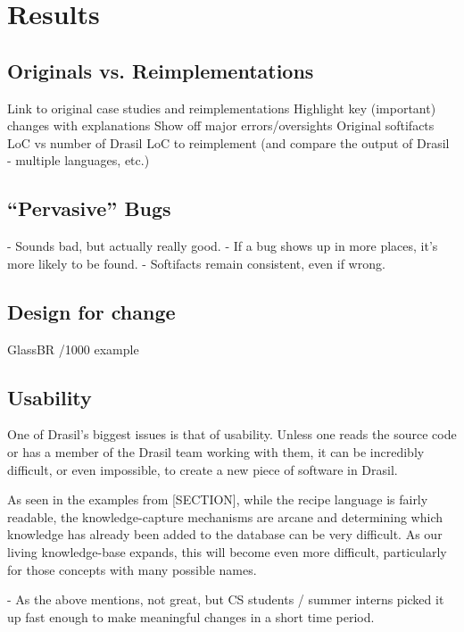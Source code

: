 \chapter{Results}

\section{Originals vs. Reimplementations}
	Link to original case studies and reimplementations
	Highlight key (important) changes with explanations
	Show off major errors/oversights
	Original softifacts LoC vs number of Drasil LoC to reimplement (and compare the output of Drasil - multiple languages, etc.)
\section{“Pervasive” Bugs} 
	- Sounds bad, but actually really good.
 - If a bug shows up in more places, it's more likely to be found.
 - Softifacts remain consistent, even if wrong.
\section{Design for change}
	GlassBR /1000 example
	
\section{Usability}
One of Drasil's biggest issues is that of usability. Unless one reads the source
code or has a member of the Drasil team working with them, it can be incredibly
difficult, or even impossible, to create a new piece of software in Drasil.

As seen in the examples from [SECTION], while the recipe language is fairly
readable, the knowledge-capture mechanisms are arcane and determining which
knowledge has already been added to the database can be very difficult. As our
living knowledge-base expands, this will become even more difficult,
particularly for those concepts with many possible names.

  - As the above mentions, not great, but CS students / summer interns picked it 
    up fast enough to make meaningful changes in a short time period.

